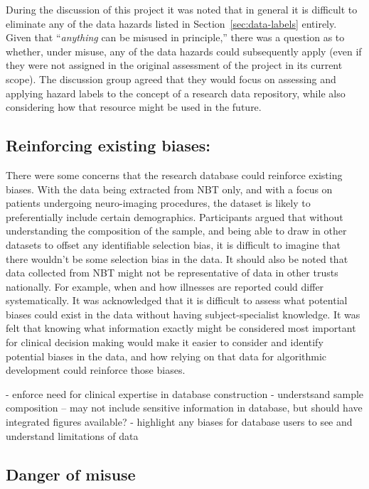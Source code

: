 \documentclass{article}
\begin{document}
During the discussion of this project it was noted that in general it
is difficult to eliminate any of the data hazards listed in
Section~\ref{sec:data-labels} entirely. Given that ``\textit{anything}
can be misused in principle,'' there was a question as to whether,
under misuse, any of the data hazards could subsequently apply (even
if they were not assigned in the original assessment of the project in
its current scope).
The discussion group agreed that they would focus on assessing and
applying hazard labels to the concept of a research data repository,
while also considering how that resource might be used in the future.\\

\subsection{Reinforcing existing biases:}
There were some concerns that the research database could reinforce
existing biases. With the data being
extracted from NBT only, and with a focus on patients undergoing
neuro-imaging procedures, the dataset is likely to preferentially
include certain demographics. Participants argued that without understanding the composition of
the sample, and being able to draw in other datasets to offset
any identifiable selection bias, it is difficult to imagine that there
wouldn't be some selection bias in the data. It should also be noted
that data collected from NBT might not be representative of data in
other trusts nationally. For example, when and how
illnesses are reported could differ systematically.
It was acknowledged that it is difficult to assess what potential
biases could exist in the data without having subject-specialist
knowledge. It was felt that knowing what information
exactly might be considered most important for clinical decision
making would make it easier to consider and identify potential biases
in the data, and how relying on that data for algorithmic development
could reinforce those biases.

- enforce need for clinical expertise in database construction
- understsand sample composition -- may not include sensitive
information in database, but should have integrated figures available?
- highlight any biases for database users to see and understand
limitations of data 

  
\subsection{Danger of misuse}
\end{document}

